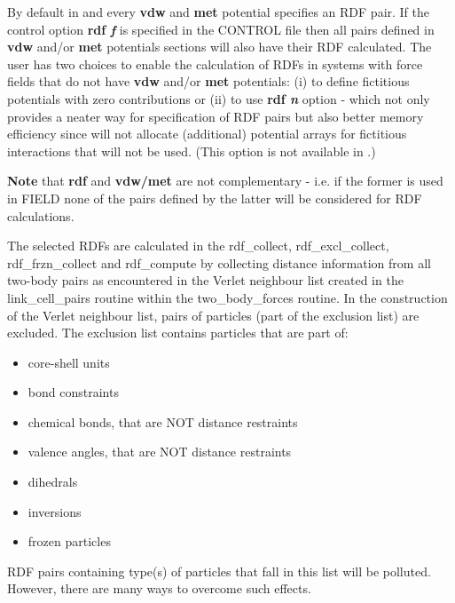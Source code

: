 \begin{enumerate}
By default in \C and \D every {\bf vdw} and {\bf met}
potential specifies an RDF pair.  If the control option
{\bf rdf {\em f}} is specified in the CONTROL file then all pairs
defined in {\bf vdw} and/or {\bf met} potentials sections will
also have their RDF calculated.  The user has two choices to enable
the calculation of RDFs in systems with force fields that do not
have {\bf vdw} and/or {\bf met} potentials: (i) to define fictitious
potentials with zero contributions or (ii) to use {\bf rdf {\em n}}
option - which not only provides a neater way for specification of
RDF pairs but also better memory efficiency since \D will not
allocate (additional) potential arrays for fictitious interactions
that will not be used.  (This option is not available in \C.)

{\bf Note} that {\bf rdf} and {\bf vdw/met} are not complementary -
i.e. if the former is used in FIELD none of the pairs defined by the
latter will be considered for RDF calculations.

The selected RDFs are calculated in the {\sc rdf\_collect},
{\sc rdf\_excl\_collect}, {\sc rdf\_frzn\_collect} and {\sc rdf\_compute}
by collecting distance information from all two-body pairs as encountered
in the Verlet neighbour list created in the {\sc link\_cell\_pairs}
routine within the {\sc two\_body\_forces} routine.  In the
construction of the Verlet neighbour list, pairs of particles
(part of the exclusion list) are excluded.  The exclusion list contains
particles that are part of:
\begin{itemize}
\item core-shell units
\item bond constraints
\item chemical bonds, that are NOT distance restraints
\item valence angles, that are NOT distance restraints
\item dihedrals
\item inversions
\item frozen particles
\end{itemize}
RDF pairs containing type(s) of particles that fall in this list will
be polluted.  However, there are many ways to overcome such effects.


\end{enumerate}
